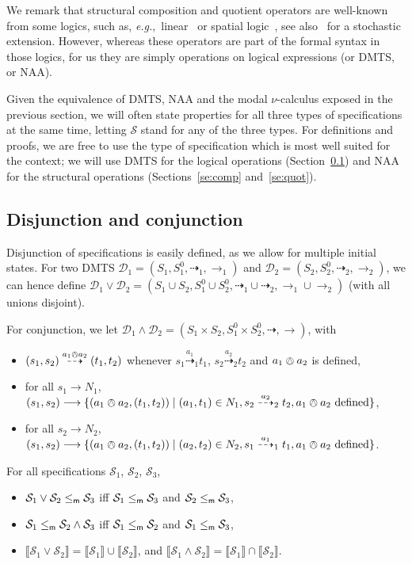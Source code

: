 \documentclass[twocolumn]{svjour3-dummy}
\newcommand*\eg{\textit{e.g.},}
\newcommand*\oland{\owedge}
\newcommand*{\must}[1]{\overset{#1}{\longrightarrow}}
\newcommand*{\omust}{\mathord{\must{}}}
\newcommand*\cD{\mathcal D}
\newcommand*{\may}[1]{\overset{#1}{\dashrightarrow}}
\newcommand*{\omay}{\mathord{\may{}}}
\newcommand*\NAA{NAA\xspace}
\newcommand*\mr{\le_\textup{\textsf{m}}}
\newcommand*\sem[1]{\llbracket #1\rrbracket}
\newcommand*\cS{\mathcal S}
\begin{document}
We remark that structural composition and quotient operators are
well-known from some logics, such as,
\eg~linear~\cite{DBLP:journals/tcs/Girard87} or spatial
logic~\cite{DBLP:journals/iandc/CairesC03}, see
also~\cite{DBLP:conf/icalp/CardelliLM11} for a stochastic extension.
However, whereas these operators are part of the formal syntax in
those logics, for us they are simply operations on logical expressions
(or DMTS, or \NAA).

Given the equivalence of DMTS, \NAA and the modal $\nu$-calculus
exposed in the previous section, we will often state properties for
all three types of specifications at the same time, letting $\cS$
stand for any of the three types.  For definitions and proofs, we are
free to use the type of specification which is most well suited for
the context; we will use DMTS for the logical operations
(Section~\ref{se:disjconj}) and \NAA for the structural operations
(Sections~\ref{se:comp} and~\ref{se:quot}).

\subsection{Disjunction and conjunction}
\label{se:disjconj}

Disjunction of specifications is easily defined, as we allow for
multiple initial states.  For two DMTS $\cD_1=( S_1, S_1^0, \omay_1,
\omust_1)$ and $\cD_2=( S_2, S_2^0, \omay_2, \omust_2)$, we can hence
define $\cD_1\lor \cD_2= (S_1 \cup S_2, S^0_1 \cup S^0_2, \omay_1 \cup
\omay_2, \omust_1\cup\omust_2)$ (with all unions disjoint).

For conjunction, we let $\cD_1\land \cD_2=( S_1\times S_2, S_1^0\times
S_2^0, \omay, \omust)$, with
\begin{itemize}
\item $( s_1, s_2)\may{ a_1\oland a_2}( t_1, t_2)$ whenever $s_1\may{
    a_1}_1 t_1$, $s_2\may{ a_2}_2 t_2$ and $a_1\oland a_2$ is defined,
\item for all $s_1\must{} N_1$, $( s_1, s_2)\must{} \{( a_1\oland a_2,(
  t_1, t_2))\mid( a_1, t_1)\in N_1, \smash{s_2\may{ a_2}_2 t_2},
  a_1\oland a_2\text{ defined}\}$,
\item for all $s_2\must{} N_2$, $( s_1, s_2)\must{} \{( a_1\oland a_2,(
  t_1, t_2))\mid( a_2, t_2)\in N_2, \smash{s_1\may{ a_1}_1 t_1},
  a_1\oland a_2\text{ defined}\}$.
\end{itemize}

\begin{theorem}
  \label{th:condis}
  For all specifications $\cS_1$, $\cS_2$, $\cS_3$,
  \begin{itemize}
  \item $\cS_1\lor \cS_2\mr \cS_3$ iff $\cS_1\mr \cS_3$ and $\cS_2\mr
    \cS_3$,
  \item $\cS_1\mr \cS_2\land \cS_3$ iff $\cS_1\mr \cS_2$ and $\cS_1\mr
    \cS_3$,
  \item $\sem{ \cS_1\lor \cS_2}= \sem{ \cS_1}\cup \sem{ \cS_2}$, and
    $\sem{ \cS_1\land \cS_2}= \sem{ \cS_1}\cap \sem{ \cS_2}$.
  \end{itemize}
\end{theorem}
\end{document}

